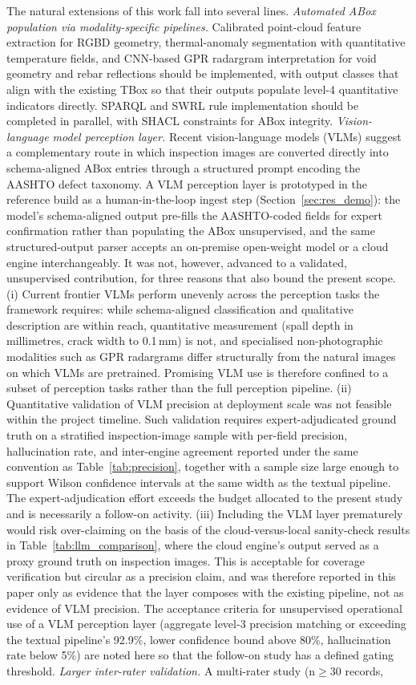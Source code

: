 \documentclass[11pt,a4paper]{article}
\begin{document}
The natural extensions of this work fall into several lines. \emph{Automated ABox population via modality-specific pipelines.} Calibrated point-cloud feature extraction for RGBD geometry, thermal-anomaly segmentation with quantitative temperature fields, and CNN-based GPR radargram interpretation for void geometry and rebar reflections should be implemented, with output classes that align with the existing TBox so that their outputs populate level-4 quantitative indicators directly. SPARQL and SWRL rule implementation should be completed in parallel, with SHACL constraints for ABox integrity. \emph{Vision-language model perception layer.} Recent vision-language models (VLMs) suggest a complementary route in which inspection images are converted directly into schema-aligned ABox entries through a structured prompt encoding the AASHTO defect taxonomy. A VLM perception layer is prototyped in the reference build as a human-in-the-loop ingest step (Section~\ref{sec:res_demo}): the model's schema-aligned output pre-fills the AASHTO-coded fields for expert confirmation rather than populating the ABox unsupervised, and the same structured-output parser accepts an on-premise open-weight model or a cloud engine interchangeably. It was not, however, advanced to a validated, unsupervised contribution, for three reasons that also bound the present scope. (i) Current frontier VLMs perform unevenly across the perception tasks the framework requires: while schema-aligned classification and qualitative description are within reach, quantitative measurement (spall depth in millimetres, crack width to 0.1\,mm) is not, and specialised non-photographic modalities such as GPR radargrams differ structurally from the natural images on which VLMs are pretrained. Promising VLM use is therefore confined to a subset of perception tasks rather than the full perception pipeline. (ii) Quantitative validation of VLM precision at deployment scale was not feasible within the project timeline. Such validation requires expert-adjudicated ground truth on a stratified inspection-image sample with per-field precision, hallucination rate, and inter-engine agreement reported under the same convention as Table~\ref{tab:precision}, together with a sample size large enough to support Wilson confidence intervals at the same width as the textual pipeline. The expert-adjudication effort exceeds the budget allocated to the present study and is necessarily a follow-on activity. (iii) Including the VLM layer prematurely would risk over-claiming on the basis of the cloud-versus-local sanity-check results in Table~\ref{tab:llm_comparison}, where the cloud engine's output served as a proxy ground truth on inspection images. This is acceptable for coverage verification but circular as a precision claim, and was therefore reported in this paper only as evidence that the layer composes with the existing pipeline, not as evidence of VLM precision. The acceptance criteria for unsupervised operational use of a VLM perception layer (aggregate level-3 precision matching or exceeding the textual pipeline's 92.9\%, lower confidence bound above 80\%, hallucination rate below 5\%) are noted here so that the follow-on study has a defined gating threshold. \emph{Larger inter-rater validation.} A multi-rater study (n$\geq$30 records, 
\end{document}

